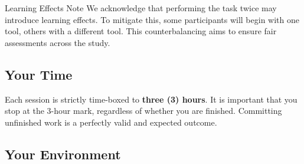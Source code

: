 \documentclass[11pt, a4paper]{article}
\begin{document}
\begin{mainbox}{Learning Effects Note}
We acknowledge that performing the task twice may introduce learning effects. To mitigate this, some participants will begin with one tool, others with a different tool. This counterbalancing aims to ensure fair assessments across the study.
\end{mainbox}

\subsection{Your Time}

Each session is strictly time-boxed to \textbf{three (3) hours}. It is important that you stop at the 3-hour mark, regardless of whether you are finished. Committing unfinished work is a perfectly valid and expected outcome.

\subsection{Your Environment}
\label{sec:your-environment}
\end{document}
